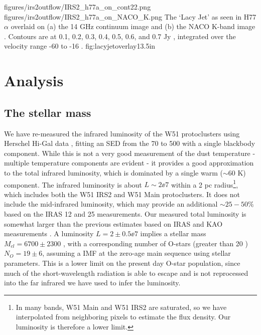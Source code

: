 \FigureTwo
{figures/irs2outflow/IRS2_h77a_on_cont22.png} %
{figures/irs2outflow/IRS2_h77a_on_NACO_K.png} %
{The `Lacy Jet' as seen in H77$\alpha$ overlaid on (a) the 14 GHz continuum
image and (b) the NACO K-band image \citep{Barbosa2008a}.  Contours are at 
0.1, 0.2, 0.3, 0.4, 0.5, 0.6, and 0.7 Jy \kms, integrated over the velocity
range -60 to -16 \kms.}
{fig:lacyjetoverlay}{1}{3.5in}

\section{Analysis}
\label{sec:analysis}
\subsection{The stellar mass}
\label{sec:stellarmass}

We have re-measured the infrared luminosity of the W51 protoclusters using Herschel
Hi-Gal data \citep{Molinari2010a,Traficante2011a}, fitting an SED from the 70
to 500 \um with a single blackbody component.
While this is not a very good
measurement of the dust temperature - multiple temperature components are
evident \citep{Sievers1991a} - it provides a good approximation to the total
infrared luminosity, which is dominated by a single warm ($\sim60$ K)
component.  The infrared luminosity is about $L\sim2\ee{7}$ \lsun within a 2 pc
radius\footnote{In many bands, W51 Main and W51 IRS2 are
saturated, so we have interpolated from neighboring pixels to estimate the flux
density.
Our luminosity is therefore a lower limit.}, which includes
both the W51 IRS2 and W51 Main protoclusters.  It does not include the
mid-infrared luminosity, which may provide an additional $\sim25-50\%$ based on
the IRAS 12 and 25 \um measurements.  Our measured total luminosity is somewhat
larger than the previous estimates based on IRAS and KAO measurements
\citep{Harvey1986a,Sievers1991a}.  A luminosity $L=2\pm0.5\ee{7}$ \lsun implies
a stellar mass $M_{cl} = 6700 \pm 2300$ \msun, with a corresponding number of
O-stars (greater than 20 \msun) $N_O = 19 \pm 6$, assuming a
\citet{Kroupa2001a} IMF at the zero-age main sequence using \citet{Vacca1996a}
stellar parameters.  This is a lower limit on the present day O-star population,
since much of the short-wavelength radiation is able to escape and is not
reprocessed into the far infrared we have used to infer the luminosity.

